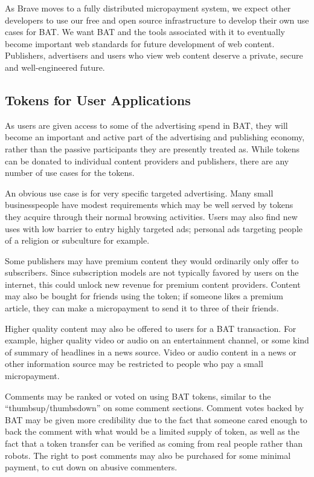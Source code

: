 \documentclass[11pt]{article}
\begin{document}
As Brave moves to a fully distributed micropayment system, we expect other developers to use our free and open source infrastructure to develop their own use cases for BAT. We want BAT and the tools associated with it to eventually become important web standards for future development of web content. Publishers, advertisers and users who view web content deserve a private, secure and well-engineered future.
\subsection{Tokens for User Applications}
\label{sec-4-4}

As users are given access to some of the advertising spend in BAT, they will become an important and active part of the advertising and publishing economy, rather than the passive participants they are presently treated as. While tokens can be donated to individual content providers and publishers, there are any number of use cases for the tokens.

An obvious use case is for very specific targeted advertising. Many small businesspeople have modest requirements which may be well served by tokens they acquire through their normal browsing activities. Users may also find new uses with low barrier to entry highly targeted ads; personal ads targeting people of a religion or subculture for example.

Some publishers may have premium content they would ordinarily only offer to subscribers. Since subscription models are not typically favored by users on the internet, this could unlock new revenue for premium content providers. Content may also be bought for friends using the token; if someone likes a premium article, they can make a micropayment to send it to three of their friends.

Higher quality content may also be offered to users for a BAT transaction. For example, higher quality video or audio on an entertainment channel, or some kind of summary of headlines in a news source. Video or audio content in a news or other information source may be restricted to people who pay a small micropayment.

Comments may be ranked or voted on using BAT tokens, similar to the ``thumbsup/thumbsdown'' on some comment sections. Comment votes backed by BAT may be given more credibility due to the fact that someone cared enough to back the comment with what would be a limited supply of token, as well as the fact that a token transfer can be verified as coming from real people rather than robots. The right to post comments may also be purchased for some minimal payment, to cut down on abusive commenters.
\end{document}
